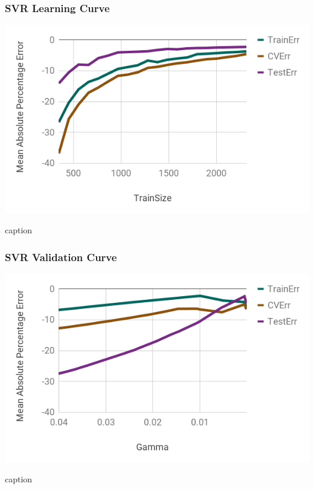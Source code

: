 
\begin{frame}
  \frametitle{SVR Learning Curve}
  \begin{table}
    \centering
    \includegraphics[height=0.8\textheight]{./figures/lc1.png}
    \caption{caption}
  \end{table}
\end{frame}

\begin{frame}
  \frametitle{SVR Validation Curve}
  \begin{table}
    \centering
    \includegraphics[height=0.8\textheight]{./figures/vc1.png}
    \caption{caption}
  \end{table}
\end{frame}

